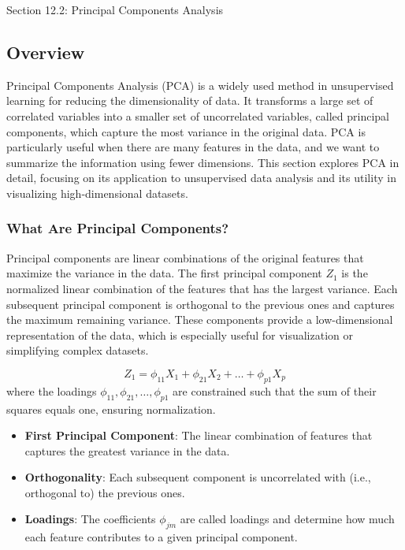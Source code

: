 \begin{notes}{Section 12.2: Principal Components Analysis}
    \subsection*{Overview}

    Principal Components Analysis (PCA) is a widely used method in unsupervised learning for reducing the dimensionality of data. It transforms a large set of correlated variables into a smaller set of uncorrelated 
    variables, called principal components, which capture the most variance in the original data. PCA is particularly useful when there are many features in the data, and we want to summarize the information 
    using fewer dimensions. This section explores PCA in detail, focusing on its application to unsupervised data analysis and its utility in visualizing high-dimensional datasets.
    
    \subsubsection*{What Are Principal Components?}
    
    Principal components are linear combinations of the original features that maximize the variance in the data. The first principal component \(Z_1\) is the normalized linear combination of the features that 
    has the largest variance. Each subsequent principal component is orthogonal to the previous ones and captures the maximum remaining variance. These components provide a low-dimensional representation 
    of the data, which is especially useful for visualization or simplifying complex datasets.
    
    \[
    Z_1 = \phi_{11} X_1 + \phi_{21} X_2 + \dots + \phi_{p1} X_p
    \]
    where the loadings $\phi_{11}, \phi_{21}, \dots, \phi_{p1}$ are constrained such that the sum of their squares equals one, ensuring normalization.
    
    \begin{highlight}
        \begin{itemize}
            \item \textbf{First Principal Component}: The linear combination of features that captures the greatest variance in the data.
            \item \textbf{Orthogonality}: Each subsequent component is uncorrelated with (i.e., orthogonal to) the previous ones.
            \item \textbf{Loadings}: The coefficients $\phi_{jm}$ are called loadings and determine how much each feature contributes to a given principal component.
        \end{itemize}
    \end{highlight}
    

\end{notes}
